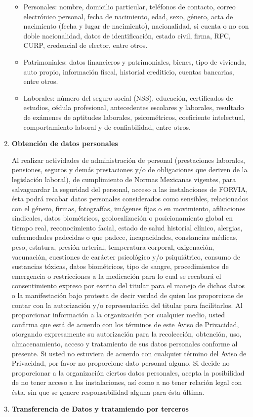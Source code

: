 \documentclass[letterpaper,12pt]{article}
\begin{document}
\begin{sloppypar}
\begin{enumerate}
          \begin{itemize}
              \item Personales: nombre, domicilio particular, teléfonos de contacto, correo electrónico personal, fecha de nacimiento, edad, sexo, género, acta de nacimiento (fecha y lugar de nacimiento), nacionalidad, si cuenta o no con doble nacionalidad, datos de identificación, estado civil, firma, RFC, CURP, credencial de elector, entre otros.
              \item Patrimoniales: datos financieros y patrimoniales, bienes, tipo de vivienda, auto propio, información fiscal, historial crediticio, cuentas bancarias, entre otros.
              \item Laborales: número del seguro social (NSS), educación, certificados de estudios, cédula profesional, antecedentes escolares y laborales, resultado de exámenes de aptitudes laborales, psicométricos, coeficiente intelectual, comportamiento laboral y de confiabilidad, entre otros.
          \end{itemize}
        \item \textbf{Obtención de datos personales}
        
        Al realizar actividades de administración de personal (prestaciones laborales, pensiones, seguros y demás prestaciones y/o de obligaciones que deriven de la legislación laboral), de cumplimiento de Normas Mexicanas vigentes, para salvaguardar la seguridad del personal, acceso a las instalaciones de FORVIA, ésta podrá recabar datos personales considerados como sensibles, relacionados con el género, firmas, fotografías, imágenes fijas o en movimiento, afiliaciones sindicales, datos biométricos, geolocalización o posicionamiento global en tiempo real, reconocimiento facial, estado de salud historial clínico, alergias, enfermedades padecidas o que padece, incapacidades, constancias médicas, peso, estatura, presión arterial, temperatura corporal, oxigenación, vacunación, cuestiones de carácter psicológico y/o psiquiátrico, consumo de sustancias tóxicas, datos biométricos, tipo de sangre, procedimientos de emergencia o restricciones a la medicación para lo cual se recabará el consentimiento expreso por escrito del titular para el manejo de dichos datos o la manifestación bajo protesta de decir verdad de quien los proporcione de contar con la autorización y/o representación del titular para facilitarlos. Al proporcionar información a  la organización por cualquier medio, usted confirma que está de acuerdo con los términos de este Aviso de Privacidad, otorgando expresamente su autorización para la recolección, obtención, uso, almacenamiento, acceso y tratamiento de sus datos personales conforme al presente. Si usted no estuviera de acuerdo con cualquier término del Aviso de Privacidad, por favor no proporcione dato personal alguno. Si decide no proporcionar a la organización ciertos datos personales, acepta la posibilidad de no tener acceso a las instalaciones, así como a no tener relación legal con ésta, sin que se genere responsabilidad alguna para ésta última.
        \item \textbf{Transferencia de Datos y tratamiendo por terceros}
        

\end{enumerate}
\end{sloppypar}
\end{document}
